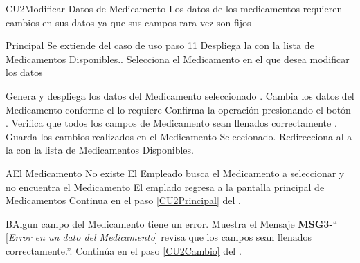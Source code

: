 \begin{UseCase}{CU2}{Modificar Datos de Medicamento}{
		Los datos de los medicamentos requieren cambios en sus datos ya que sus campos rara vez son fijos
	}
	\end{UseCase}
	\begin{UCtrayectoria}{Principal}
		\UCpaso Se extiende del caso de uso  paso 11
		\UCpaso Despliega la  con la lista de Medicamentos Disponibles.\label{CU2Principal}.
		\UCpaso[\UCactor] Selecciona el Medicamento en el que desea modificar los datos 

		\UCpaso Genera y despliega los datos del Medicamento seleccionado \label{CU2Cambio}.
		\UCpaso [\UCactor] Cambia los datos del Medicamento conforme el lo requiere
		\UCpaso[\UCactor] Confirma la operación presionando el botón .
		\UCpaso Verifica que todos los campos de Medicamento  sean llenados correctamente   .
		\UCpaso Guarda los cambios realizados en el Medicamento Seleccionado.
		\UCpaso Redirecciona al \UCactor a la   con la lista de Medicamentos Disponibles.
	
	\end{UCtrayectoria}


		\begin{UCtrayectoriaA}{A}{El Medicamento No existe}
			\UCpaso[\UCactor] El Empleado busca el Medicamento a seleccionar y no encuentra el Medicamento
			\UCpaso[\UCactor] El emplado regresa a la pantalla principal de Medicamentos
			\UCpaso Continua en el paso \ref{CU2Principal} del .
		\end{UCtrayectoriaA}


		\begin{UCtrayectoriaA}{B}{Algun campo del Medicamento tiene un error.}
			\UCpaso Muestra el Mensaje {\bf MSG3-}`` [{\em Error en un dato del Medicamento}] revisa que los campos sean llenados correctamente.''.
			\UCpaso Continúa en el paso \ref{CU2Cambio} del .
		\end{UCtrayectoriaA}
		
